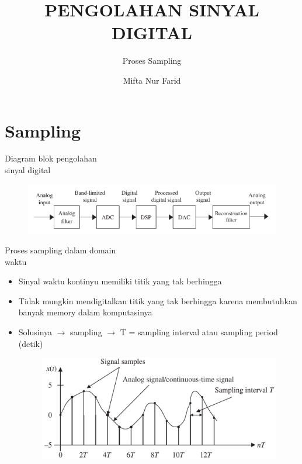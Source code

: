 \documentclass[pdflatex,compress,mathserif]{beamer}
\title{PENGOLAHAN SINYAL DIGITAL}
\subtitle{Proses Sampling}
\author{Mifta Nur Farid}
\begin{document}
\maketitle

\section{Sampling}

\begin{frame}{Diagram blok pengolahan\\sinyal digital}
    \begin{figure}
        \includegraphics[width=\linewidth]{./img/img01.png}
    \end{figure}
\end{frame}

\begin{frame}{Proses sampling dalam domain\\waktu}
    \begin{itemize}
        \item Sinyal waktu kontinyu memiliki titik yang tak berhingga
        \item Tidak mungkin mendigitalkan titik yang tak berhingga karena membutuhkan banyak memory dalam komputasinya
        \item Solusinya $\rightarrow$ sampling $\rightarrow$ T = sampling interval atau sampling period (detik)
        \begin{figure}
            \includegraphics[width=0.9\linewidth]{./img/img02.png}
        \end{figure}
    \end{itemize}
\end{frame}
\end{document}
